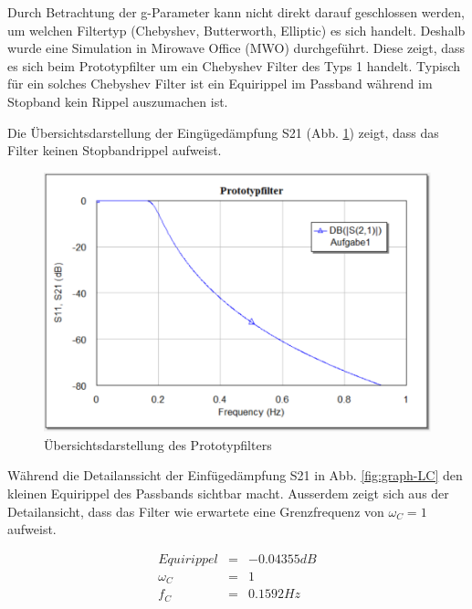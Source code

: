 Durch Betrachtung der g-Parameter kann nicht direkt darauf geschlossen werden, um welchen Filtertyp (Chebyshev, Butterworth, Elliptic) es sich handelt. Deshalb wurde eine Simulation in Mirowave Office (MWO) durchgeführt. Diese zeigt, dass es sich beim Prototypfilter um ein Chebyshev Filter des Typs 1 handelt. Typisch für ein solches Chebyshev Filter ist ein Equirippel im Passband während im Stopband kein Rippel auszumachen ist. 

Die Übersichtsdarstellung der Eingügedämpfung S21 (Abb. \ref{fig:Ovw_Prototyp}) zeigt, dass das Filter keinen Stopbandrippel aufweist.

\begin{figure}[h!]
    \centering
 	\includegraphics[width=\imagewidth]{images/Ovw_Prototyp.png}
 	\caption{Übersichtsdarstellung des Prototypfilters}
 	\label{fig:Ovw_Prototyp}
\end{figure}

Während die Detailanssicht der Einfügedämpfung  S21 in Abb. \ref{fig:graph-LC}
den kleinen Equirippel des Passbands sichtbar macht. Ausserdem zeigt  sich aus
der  Detailansicht, dass das  Filter  wie  erwartete  eine  Grenzfrequenz  von
$\omega_C = 1$ aufweist.

\begin{mdframed}
    \begin{equation*} 
        \begin{array}{rclcl} 
            Equirippel & = & -0.04355 dB \\ 
            \omega_C & = & 1 \\ 
            f_C & = & 0.1592 Hz \\ 
        \end{array} 
    \end{equation*} 
\end{mdframed}

